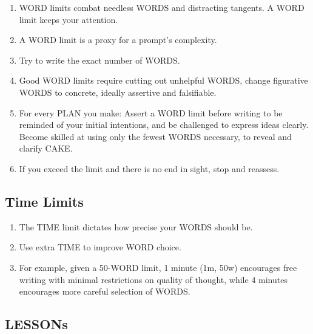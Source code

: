 \documentclass[
]{book}
\providecommand{\tightlist}{%
  \setlength{\itemsep}{0pt}\setlength{\parskip}{0pt}}
\begin{document}
\begin{enumerate}
\def\labelenumi{\arabic{enumi}.}
\setcounter{enumi}{9}
\tightlist
\item
  WORD limits combat needless WORDS and distracting tangents. A
  WORD limit keeps your attention.
\item
  A WORD limit is a proxy for a prompt's complexity.
\item
  Try to write the exact number of WORDS.
\item
  Good WORD limits require cutting out unhelpful WORDS, change
  figurative WORDS to concrete, ideally assertive and falsifiable.
\item
  For every PLAN you make: Assert a WORD limit before writing
  to be reminded of your initial intentions, and
  be challenged to express ideas clearly.
  Become skilled at using only the fewest WORDS necessary, to
  reveal and clarify CAKE.
\item
  If you exceed the limit and there is no end in sight, stop and reassess.
\end{enumerate}

\hypertarget{time-limits}{%
\subsection{Time Limits}\label{time-limits}}

\begin{enumerate}
\def\labelenumi{\arabic{enumi}.}
\setcounter{enumi}{15}
\tightlist
\item
  The TIME limit dictates how precise your WORDS should be.
\item
  Use extra TIME to improve WORD choice.
\item
  For example, given a 50-WORD limit, 1 minute (1m, 50w) encourages
  free writing with minimal restrictions on quality of thought, while 4 minutes encourages more careful selection of WORDS.
\end{enumerate}

\hypertarget{lessons-1}{%
\subsection{LESSONs}\label{lessons-1}}
\end{document}
